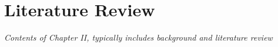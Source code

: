 \chapter{Literature Review}

\emph{Contents of Chapter II, typically includes background and literature
review}
